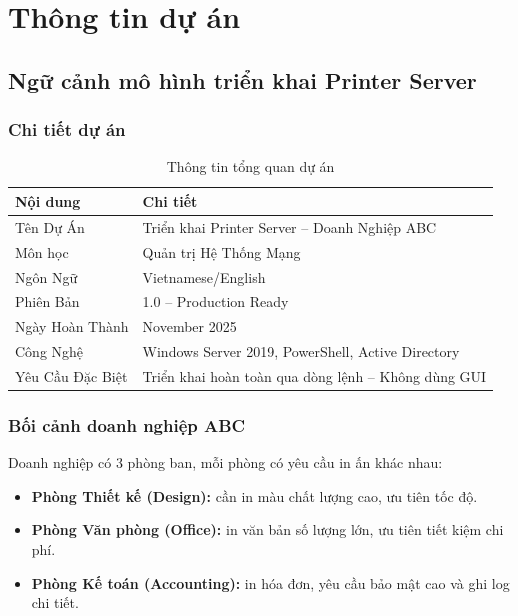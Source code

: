 \chapter{\textbf{Thông tin dự án}}
\label{sec:Bai1}

\section{Ngữ cảnh mô hình triển khai Printer Server}

\subsection{Chi tiết dự án}
\begin{table}[htbp]
\centering
\small
\begin{tabular}{|l|p{10.5cm}|}
\hline
\textbf{Nội dung} & \textbf{Chi tiết} \\
\hline
Tên Dự Án & Triển khai Printer Server – Doanh Nghiệp ABC \\
\hline
Môn học & Quản trị Hệ Thống Mạng \\
\hline
Ngôn Ngữ & Vietnamese/English \\
\hline
Phiên Bản & 1.0 – Production Ready \\
\hline
Ngày Hoàn Thành & November 2025 \\
\hline
Công Nghệ & Windows Server 2019, PowerShell, Active Directory \\
\hline
Yêu Cầu Đặc Biệt & Triển khai hoàn toàn qua dòng lệnh – Không dùng GUI \\
\hline
\end{tabular}
\caption{Thông tin tổng quan dự án}
\label{tab:project_info}
\end{table}

\subsection{Bối cảnh doanh nghiệp ABC}

Doanh nghiệp có 3 phòng ban, mỗi phòng có yêu cầu in ấn khác nhau:

\begin{itemize}[leftmargin=*,noitemsep,topsep=3pt]
    \item \textbf{Phòng Thiết kế (Design):} cần in màu chất lượng cao, ưu tiên tốc độ.
    \item \textbf{Phòng Văn phòng (Office):} in văn bản số lượng lớn, ưu tiên tiết kiệm chi phí.
    \item \textbf{Phòng Kế toán (Accounting):} in hóa đơn, yêu cầu bảo mật cao và ghi log chi tiết.
\end{itemize}

